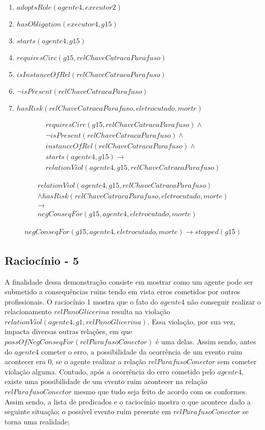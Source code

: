 \begin{enumerate}
	\item $adoptsRole(agente4,executor2)$
	\item $hasObligation(executor4,g15)$	
	\item $starts(agente4,g15)$ 
	\item $requiresCirc(g15,relChaveCatracaParafuso)$
	\item $isInstanceOfRel(relChaveCatracaParafuso)$	
	\item $\neg isPresent(relChaveCatracaParafuso)$
	\item $hasRisk(relChaveCatracaParafuso,eletrocutado,morte)$
\end{enumerate}

\begin{eqnarray}
	requiresCirc(g15,relChaveCatracaParafuso)\wedge \nonumber \\
	\neg isPresent(relChaveCatracaParafuso) \wedge \nonumber \\
	instanceOfRel(relChaveCatracaParafuso) \wedge \nonumber \\
	starts(agente4,g15) \to \nonumber \\
	relationViol(agente4,g15,relChaveCatracaParafuso) \nonumber
\end{eqnarray}

\begin{eqnarray}\nonumber
	relationViol(agente4,g15,relChaveCatracaParafuso) \nonumber \\ 
	 \wedge hasRisk(relChaveCatracaParafuso,eletrocutado,morte) \nonumber \\ 
	\to \nonumber \\ 
	negConseqFor(g15,agente4,eletrocutado,morte)
\end{eqnarray}

\begin{eqnarray}
		negConseqFor(g15,agente4,eletrocutado,morte) \to stopped(g15)
\end{eqnarray}

\subsection{Raciocínio - 5} 
\label{raciocinio5}
A finalidade dessa demonstração consiste em mostrar como um agente pode ser submetido a consequências ruins tendo em vista erros cometidos por outros profissionais. O raciocínio 1 mostra que o fato do $agente4$ não conseguir realizar o relacionamento $relPanoGlicerina$ resulta na violação $relationViol(agente4,g1,relPanoGlicerina)$. Essa violação, por sua vez, impacta diversas outras relações, em que $possOfNegConseqFor(relParafusoConector)$ é uma delas. Assim sendo, antes do $agente4$ cometer o erro, a possibilidade da ocorrência de um evento ruim acontecer era 0, se o agente realizar a relação $relParafusoConector$ sem cometer violação alguma. Contudo, após a ocorrência do erro cometido pelo $agente4$, existe uma possibilidade de um evento ruim acontecer na relação $relParafusoConector$ mesmo que tudo seja feito de acordo com os conformes. Assim sendo, a lista de predicados e o raciocínio mostra o que acontece dado a seguinte situação; o possível evento ruim presente em $relParafusoConector$ se torna uma realidade;  

